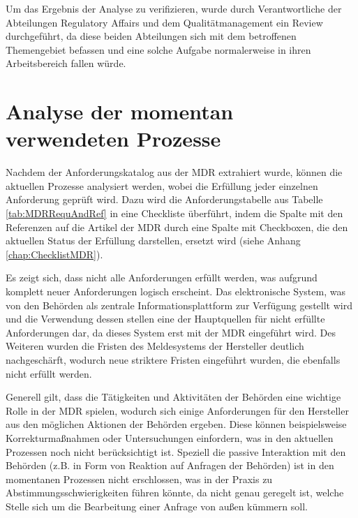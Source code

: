 \documentclass[a4paper,12pt]{report}
\begin{document}
\hline
{}
Um das Ergebnis der Analyse zu verifizieren, wurde durch Verantwortliche der Abteilungen Regulatory Affairs und dem Qualitätmanagement ein Review durchgeführt, da diese beiden Abteilungen sich mit dem betroffenen Themengebiet befassen und eine solche Aufgabe normalerweise in ihren Arbeitsbereich fallen würde.

\section{Analyse der momentan verwendeten Prozesse}
Nachdem der Anforderungskatalog aus der MDR extrahiert wurde, können die aktuellen Prozesse analysiert werden, wobei die Erfüllung jeder einzelnen Anforderung geprüft wird. Dazu wird die Anforderungstabelle aus Tabelle \ref{tab:MDRRequAndRef} in eine Checkliste überführt, indem die Spalte mit den Referenzen auf die Artikel der MDR durch eine Spalte mit Checkboxen, die den aktuellen Status der Erfüllung darstellen, ersetzt wird (siehe Anhang \ref{chap:ChecklistMDR}).

Es zeigt sich, dass nicht alle Anforderungen erfüllt werden, was aufgrund komplett neuer Anforderungen logisch erscheint. Das elektronische System, was von den Behörden als zentrale Informationsplattform zur Verfügung gestellt wird und die Verwendung dessen stellen eine der Hauptquellen für nicht erfüllte Anforderungen dar, da dieses System erst mit der MDR eingeführt wird. Des Weiteren wurden die Fristen des Meldesystems der Hersteller deutlich nachgeschärft, wodurch neue striktere Fristen eingeführt wurden, die ebenfalls nicht erfüllt werden. 

Generell gilt, dass die Tätigkeiten und Aktivitäten der Behörden eine wichtige Rolle in der MDR spielen, wodurch sich einige Anforderungen für den Hersteller aus den möglichen Aktionen der Behörden ergeben. Diese können beispielsweise Korrekturmaßnahmen oder Untersuchungen einfordern, was in den aktuellen Prozessen noch nicht berücksichtigt ist. Speziell die passive Interaktion mit den Behörden (z.B. in Form von Reaktion auf Anfragen der Behörden) ist in den momentanen Prozessen nicht erschlossen, was in der Praxis zu Abstimmungsschwierigkeiten führen könnte, da nicht genau geregelt ist, welche Stelle sich um die Bearbeitung einer Anfrage von außen kümmern soll.
\end{document}
